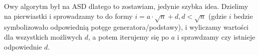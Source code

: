 Owy algorytm był na ASD dlatego to zostawiam, jedynie szybka idea. Dzielimy na pierwiastki i sprowadzamy to do formy $i = a\cdot \sqrt{n} + d, d< \sqrt{n}$ (gdzie $i$ bedzie symbolizowało odpowiednią potęge generatora/podstawy), i wyliczamy wartości dla wszystkich możliwych $d$, a potem iterujemy się po $a$ i sprawdzamy czy istnieje odpowiednie $d$.